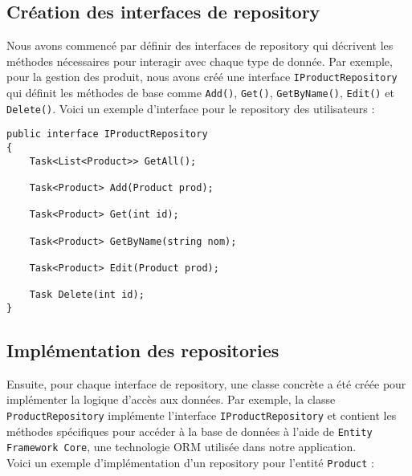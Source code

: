 \subsection{Création des interfaces de repository}

Nous avons commencé par définir des interfaces de repository qui décrivent les méthodes nécessaires pour interagir avec chaque type de donnée. Par exemple, pour la gestion des produit, nous avons créé une interface \texttt{IProductRepository} qui définit les méthodes de base comme \texttt{Add()}, \texttt{Get()}, \texttt{GetByName()}, \texttt{Edit()} et \texttt{Delete()}. Voici un exemple d'interface pour le repository des utilisateurs :

\begin{lstlisting}[language=CSharp]
public interface IProductRepository
{
    Task<List<Product>> GetAll();

    Task<Product> Add(Product prod);

    Task<Product> Get(int id);

    Task<Product> GetByName(string nom);

    Task<Product> Edit(Product prod);

    Task Delete(int id);
}
\end{lstlisting}

\subsection{Implémentation des repositories}

Ensuite, pour chaque interface de repository, une classe concrète a été créée pour implémenter la logique d'accès aux données. Par exemple, la classe \texttt{ProductRepository} implémente l'interface \texttt{IProductRepository} et contient les méthodes spécifiques pour accéder à la base de données à l'aide de \texttt{Entity Framework Core}, une technologie ORM utilisée dans notre application.\\

Voici un exemple d'implémentation d'un repository pour l'entité \texttt{Product} :

